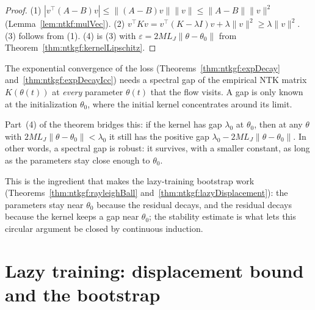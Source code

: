 \begin{proof}
  \leanok
(1) $|v^\top(A-B)v|\le\|(A-B)v\|\|v\|\le\|A-B\|\|v\|^2$ (Lemma~\ref{lem:ntkf:mulVec}). (2) $v^\top Kv=v^\top(K-\lambda I)v+\lambda\|v\|^2\ge\lambda\|v\|^2$. (3) follows from (1).
(4) is (3) with $\varepsilon=2ML_J\|\theta-\theta_0\|$ from Theorem~\ref{thm:ntkgf:kernelLipschitz}.
\end{proof}

\begin{remark}\label{rmk:ntkgf:rayleighSignificance}
The exponential convergence of the loss (Theorems~\ref{thm:ntkgf:expDecay} and~\ref{thm:ntkgf:expDecayIcc}) needs a spectral gap of the empirical NTK matrix $K(\theta(t))$ at \emph{every} parameter $\theta(t)$ that the flow visits. A gap is only known at the initialization $\theta_0$, where the initial kernel concentrates around its limit.

Part~(4) of the theorem bridges this: if the kernel has gap $\lambda_0$ at $\theta_0$, then at any $\theta$ with $2ML_J\|\theta-\theta_0\|<\lambda_0$ it still has the positive gap $\lambda_0-2ML_J\|\theta-\theta_0\|$. In other words, a spectral gap is robust: it survives, with a smaller constant, as long as the parameters stay close enough to $\theta_0$.

This is the ingredient that makes the lazy-training bootstrap work (Theorems~\ref{thm:ntkgf:rayleighBall} and~\ref{thm:ntkgf:lazyDisplacement}): the parameters stay near $\theta_0$ because the residual decays, and the residual decays because the kernel keeps a gap near $\theta_0$; the stability estimate is what lets this circular argument be closed by continuous induction.
\end{remark}


\section{Lazy training: displacement bound and the bootstrap}\label{sec:ntkgf:bootstrap}

